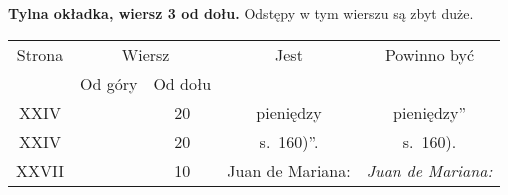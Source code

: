 \documentclass[a4paper,11pt]{article}
\numberwithin{equation}{section}
\begin{document}
\noindent
\textbf{Tylna okładka, wiersz 3 od dołu.} Odstępy w tym wierszu są
zbyt duże.










\begin{center}

  \begin{tabular}{|c|c|c|c|c|}
    \hline
    Strona & \multicolumn{2}{c|}{Wiersz} & Jest
                              & Powinno być \\ \cline{2-3}
    & Od góry & Od dołu & & \\
    \hline
    XXIV  & & 20 & pieniędzy & pieniędzy” \\
    XXIV  & & 20 & s.~160)”. & s.~160). \\
    XXVII & & 10 & Juan de Mariana: & \textit{Juan de Mariana:} \\
    \hline
  \end{tabular}






\end{center}
\end{document}
